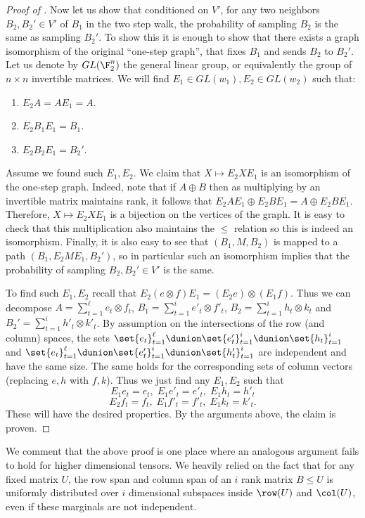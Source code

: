 \begin{proof}[Proof of ]
Now let us show that conditioned on \(V'\), for any two neighbors \(B_2,B_2' \in V'\) of \(B_1\) in the two step walk, the probability of sampling \(B_2\) is the same as sampling \(B_2'\). To show this it is enough to show that there exists a graph isomorphism of the original ``one-step graph'', that fixes \(B_1\) and sends \(B_2\) to \(B_2'\). Let us denote by \(GL(\F_2^n)\) the general linear group, or equivalently the group of \(n \times n\) invertible matrices. We will find \(E_1 \in GL(w_1), E_2 \in GL(w_2)\) such that:
\begin{enumerate}
    \item \(E_2 A=A E_1 = A\).
    \item \(E_2 B_1 E_1 = B_1\).
    \item \(E_2 B_2 E_1 = B_2'\).
\end{enumerate}
Assume we found such \(E_1,E_2\). We claim that \(X \mapsto E_2 X E_1\) is an isomorphism of the one-step graph. Indeed, note that if \(A \oplus B\) then as multiplying by an invertible matrix maintains rank, it follows that \(E_2 A E_1 \oplus E_2 B E_1= A \oplus E_2 B E_1\). Therefore, \(X \mapsto E_2 X E_1\) is a bijection on the vertices of the graph. It is easy to check that this multiplication also maintains the \(\leq\) relation so this is indeed an isomorphism. Finally, it is also easy to see that \((B_1,M,B_2)\) is mapped to a path \((B_1,E_2 M E_1,B_2')\), so in particular such an isomorphism implies that the probability of sampling \(B_2,B_2' \in V'\) is the same.

To find such \(E_1,E_2\) recall that \(E_2 (e \otimes f) E_1 = (E_2 e) \otimes (E_1 f)\). Thus we can decompose \(A = \sum_{t=1}^\ell e_t \otimes f_t\), \(B_1 = \sum_{t=1}^i e'_t \otimes f'_t\), \(B_2 = \sum_{t=1}^i h_t \otimes k_t\) and \(B_2' = \sum_{t=1}^i h'_t \otimes k'_t\). By assumption on the intersections of the row (and column) spaces, the sets \(\set{e_t}_{t=1}^\ell \dunion \set{e'_t}_{t=1}^i \dunion \set{h_t}_{t=1}^i\) and \(\set{e_t}_{t=1}^\ell \dunion \set{e'_t}_{t=1}^i \dunion \set{h'_t}_{t=1}^i\) are independent and have the same size. The same holds for the corresponding sets of column vectors (replacing \(e,h\) with \(f,k\)). Thus we just find any \(E_1,E_2\) such that
\[E_1 e_t = e_t, \; E_1 e'_t = e'_t, \; E_1 h_t = h'_t\]
\[E_2 f_t = f_t, \; E_1 f'_t = f'_t, \; E_1 k_t = k'_t.\]
These will have the desired properties. By the arguments above, the claim is proven.
\end{proof}
We comment that the above proof is one place where an analogous argument fails to hold for higher dimensional tensors. We heavily relied on the fact that for any fixed matrix \(U\), the row span and column span of an \(i\) rank matrix \(B \leq U\) is uniformly distributed over \(i\) dimensional subspaces inside \(\row(U)\) and \(\col(U)\), even if these marginals are not independent.


